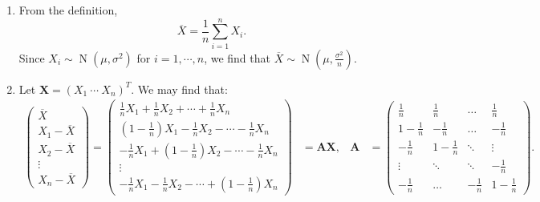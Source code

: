 \documentclass{huhtakm-template-book-v2}
\DeclareMathOperator{\N}{N}
\begin{document}
    \begin{proofing}
        \begin{enumerate}
            \item From the definition,
            \begin{equation*}
                \overline{X} = \frac{1}{n} \sum_{i=1}^{n} X_{i}.
            \end{equation*}
            Since $X_{i} \sim \N(\mu, \sigma^{2})$ for $i = 1, \cdots, n$, we find that $\overline{X} \sim \N\left(\mu, \frac{\sigma^{2}}{n}\right)$.
            \item Let $\mathbf{X} = (X_{1}\ \cdots\ X_{n})^{T}$. We may find that:
            \begin{align*}
                \begin{pmatrix}
                    \overline{X}\\ X_{1} - \overline{X}\\ X_{2} - \overline{X}\\ \vdots\\ X_{n} - \overline{X}
                \end{pmatrix}=\begin{pmatrix}
                    \frac{1}{n}X_{1} + \frac{1}{n}X_{2} + \cdots + \frac{1}{n}X_{n}\\
                    \left(1 - \frac{1}{n}\right)X_{1} - \frac{1}{n}X_{2} - \cdots - \frac{1}{n}X_{n}\\
                    -\frac{1}{n}X_{1} + \left(1 - \frac{1}{n}\right)X_{2} - \cdots - \frac{1}{n}X_{n}\\
                    \vdots\\
                    -\frac{1}{n}X_{1} - \frac{1}{n}X_{2} - \cdots + \left(1 - \frac{1}{n}\right)X_{n}
                \end{pmatrix} &= \mathbf{AX}, & \mathbf{A} &= \begin{pmatrix}
                    \frac{1}{n} & \frac{1}{n} & \hdots & \frac{1}{n}\\
                    1 - \frac{1}{n} & -\frac{1}{n} & \hdots & -\frac{1}{n}\\
                    -\frac{1}{n} & 1 - \frac{1}{n} & \ddots & \vdots\\
                    \vdots & \ddots & \ddots & -\frac{1}{n}\\
                    -\frac{1}{n} & \hdots & -\frac{1}{n} & 1 - \frac{1}{n}
                \end{pmatrix}.
            \end{align*}

\end{enumerate}
\end{proofing}
\end{document}
